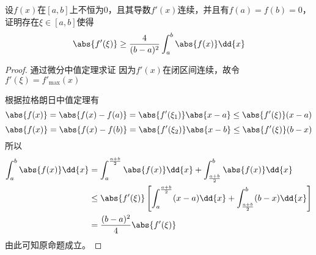 \begin{example}
    设$f(x)$在$[a,b]$上不恒为$0$，且其导数$f'(x)$连续，并且有$f(a)=f(b)=0$，证明存在$\xi\in[a,b]$使得
    \[ \abs{f'(\xi)} \geq \frac{4}{(b-a)^2} \int_a^b\abs{f(x)}\dd{x} \]
\end{example}
\begin{proof}
    通过微分中值定理求证
    因为$f'(x)$在闭区间连续，故令$f'(\xi) = f'_{\max}(x)$

    根据拉格朗日中值定理有
    \[ \abs{f(x)} = \abs{f(x)-f(a)} = \abs{f'(\xi_1)}\abs{x-a} \leq \abs{f'(\xi)}(x-a) \]
    \[ \abs{f(x)} = \abs{f(x)-f(b)} = \abs{f'(\xi_2)}\abs{x-b} \leq \abs{f'(\xi)}(b-x) \]
    所以
    \begin{align*}
        \int_a^b\abs{f(x)}\dd{x} & = \int_a^{\frac{a+b}{2}} \abs{f(x)}\dd{x} + \int_{\frac{a+b}{2}}^b \abs{f(x)}\dd{x}                      \\
                                 & \leq \abs{f'(\xi)}\left[ \int_a^{\frac{a+b}{2}} (x-a)\dd{x} + \int_{\frac{a+b}{2}}^b (b-x)\dd{x} \right] \\
                                 & = \frac{(b-a)^2}{4}\abs{f'(\xi)}
    \end{align*}
    由此可知原命题成立。
\end{proof}

